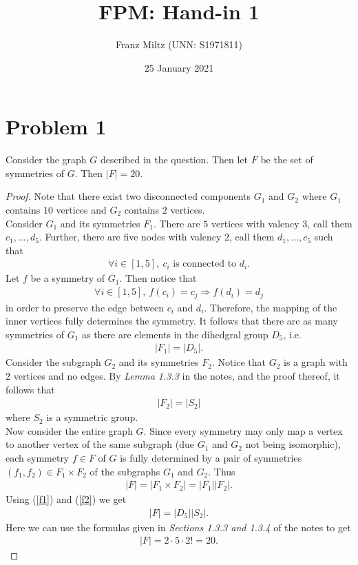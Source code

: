 \documentclass{article}
\begin{document}
\title{FPM: Hand-in 1}
\author{Franz Miltz (UNN: S1971811)}
\date{25 January 2021}
\maketitle

\section*{Problem 1}
\begin{claim}
  Consider the graph $G$ described in the question. Then
  let $F$ be the set of symmetries of $G$. Then $|F|=20$.
\end{claim}
\begin{proof}
   Note that there exist two disconnected components
   $G_1$ and $G_2$ where $G_1$ contains $10$ vertices
   and $G_2$ contains $2$ vertices. \\
   Consider $G_1$ and its symmetries $F_1$. There are $5$ vertices with valency
   $3$, call them $c_1, ..., d_5$. Further, there are 
   five nodes with valency $2$, call them $d_1, ..., c_5$
   such that
   \begin{align*}
      \forall i\in[1,5],\: c_i \text{ is connected to } d_i.
   \end{align*}
   Let $f$ be a symmetry of $G_1$. Then notice that
   \begin{align*}
      \forall i\in[1,5],\: f(c_i)=c_j \Rightarrow f(d_i)=d_j
   \end{align*}
   in order to preserve the edge between $c_i$ and $d_i$.
   Therefore, the mapping of the inner vertices fully
   determines the symmetry. It follows that there are as
   many symmetries of $G_1$ as there are elements in the
   dihedgral group $D_5$, i.e.
   \begin{align}
      \label{f1}
      |F_1|=|D_5|. 
   \end{align}
   Consider the subgraph $G_2$ and its symmetries $F_2$.
   Notice that $G_2$ is a graph with $2$ vertices and
   no edges. By \emph{Lemma 1.3.3} in the notes, and the
   proof thereof, it follows that
   \begin{align}
      \label{f2}
      |F_2|=|S_2|
   \end{align}
   where $S_2$ is a symmetric group.\\
   Now consider the entire graph $G$. Since every symmetry may
   only map a vertex to another vertex of the same subgraph
   (due $G_1$ and $G_2$ not being isomorphic),
   each symmetry $f\in F$ of $G$ is fully determined by
   a pair of symmetries $(f_1, f_2)\in F_1\times F_2$ of
   the subgraphs $G_1$ and $G_2$. Thus
   \begin{align*}
      |F| = |F_1\times F_2| = |F_1||F_2|.
   \end{align*}
   Using (\ref{f1}) and (\ref{f2}) we get
   \begin{align*}
      |F| = |D_5||S_2|.
   \end{align*}
   Here we can use the formulas given in \emph{Sections 1.3.3
   and 1.3.4} of the notes to get
   \begin{align*}
      |F| = 2\cdot 5\cdot 2! = 20.
   \end{align*}
\end{proof}
\end{document}
